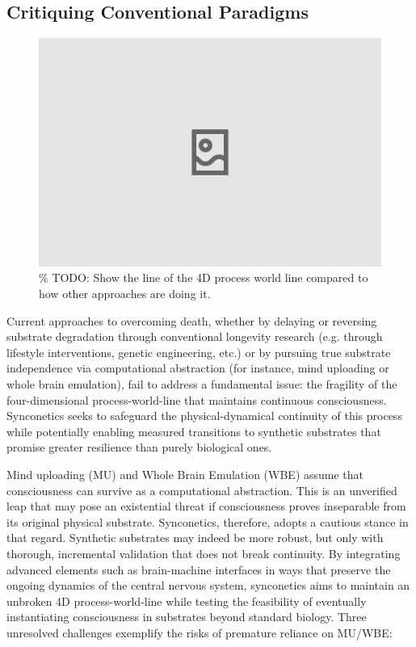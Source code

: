 \documentclass[10pt]{article}
\begin{document}
\begin{sloppypar}
  \subsection{Critiquing Conventional Paradigms}
  \label{sec:new-paradigm}

  \begin{figure}[ht!]
    \centering
    \includegraphics[width=\textwidth]{figures/other-approaches.png}
    \caption{\% TODO: Show the line of the 4D process world line compared to how other approaches are doing it.}
    \label{fig:other-approaches}
  \end{figure}

  Current approaches to overcoming death, whether by delaying or reversing substrate degradation through conventional longevity research (e.g. through lifestyle interventions, genetic engineering, etc.) or by pursuing true substrate independence via computational abstraction (for instance, mind uploading or whole brain emulation), fail to address a fundamental issue: the fragility of the four-dimensional process-world-line that maintains continuous consciousness. Synconetics seeks to safeguard the physical-dynamical continuity of this process while potentially enabling measured transitions to synthetic substrates that promise greater resilience than purely biological ones.

  Mind uploading (MU) and Whole Brain Emulation (WBE) assume that consciousness can survive as a computational abstraction. This is an unverified leap that may pose an existential threat if consciousness proves inseparable from its original physical substrate. Synconetics, therefore, adopts a cautious stance in that regard. Synthetic substrates may indeed be more robust, but only with thorough, incremental validation that does not break continuity. By integrating advanced elements such as brain-machine interfaces in ways that preserve the ongoing dynamics of the central nervous system, synconetics aims to maintain an unbroken 4D process-world-line while testing the feasibility of eventually instantiating consciousness in substrates beyond standard biology. Three unresolved challenges exemplify the risks of premature reliance on MU/WBE:


\end{sloppypar}
\end{document}
